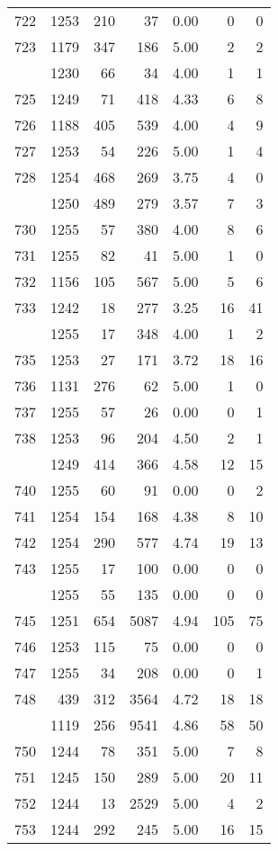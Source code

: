 \documentclass[
]{article}
\begin{document}
\begin{table}
\begin{tabular}[t]{lrrrrrr}
722 & 1253 & 210 & 37 & 0.00 & 0 & 0\\
723 & 1179 & 347 & 186 & 5.00 & 2 & 2\\
\addlinespace
724 & 1230 & 66 & 34 & 4.00 & 1 & 1\\
725 & 1249 & 71 & 418 & 4.33 & 6 & 8\\
726 & 1188 & 405 & 539 & 4.00 & 4 & 9\\
727 & 1253 & 54 & 226 & 5.00 & 1 & 4\\
728 & 1254 & 468 & 269 & 3.75 & 4 & 0\\
\addlinespace
729 & 1250 & 489 & 279 & 3.57 & 7 & 3\\
730 & 1255 & 57 & 380 & 4.00 & 8 & 6\\
731 & 1255 & 82 & 41 & 5.00 & 1 & 0\\
732 & 1156 & 105 & 567 & 5.00 & 5 & 6\\
733 & 1242 & 18 & 277 & 3.25 & 16 & 41\\
\addlinespace
734 & 1255 & 17 & 348 & 4.00 & 1 & 2\\
735 & 1253 & 27 & 171 & 3.72 & 18 & 16\\
736 & 1131 & 276 & 62 & 5.00 & 1 & 0\\
737 & 1255 & 57 & 26 & 0.00 & 0 & 1\\
738 & 1253 & 96 & 204 & 4.50 & 2 & 1\\
\addlinespace
739 & 1249 & 414 & 366 & 4.58 & 12 & 15\\
740 & 1255 & 60 & 91 & 0.00 & 0 & 2\\
741 & 1254 & 154 & 168 & 4.38 & 8 & 10\\
742 & 1254 & 290 & 577 & 4.74 & 19 & 13\\
743 & 1255 & 17 & 100 & 0.00 & 0 & 0\\
\addlinespace
744 & 1255 & 55 & 135 & 0.00 & 0 & 0\\
745 & 1251 & 654 & 5087 & 4.94 & 105 & 75\\
746 & 1253 & 115 & 75 & 0.00 & 0 & 0\\
747 & 1255 & 34 & 208 & 0.00 & 0 & 1\\
748 & 439 & 312 & 3564 & 4.72 & 18 & 18\\
\addlinespace
749 & 1119 & 256 & 9541 & 4.86 & 58 & 50\\
750 & 1244 & 78 & 351 & 5.00 & 7 & 8\\
751 & 1245 & 150 & 289 & 5.00 & 20 & 11\\
752 & 1244 & 13 & 2529 & 5.00 & 4 & 2\\
753 & 1244 & 292 & 245 & 5.00 & 16 & 15\\

\end{tabular}
\end{table}
\end{document}
